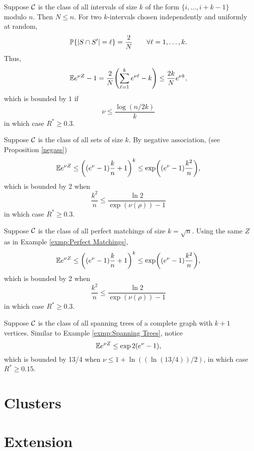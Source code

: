 \documentclass[10pt, oneside]{article}
\begin{document}
\begin{exmp}
  Suppose ${\mathcal C}$ is the class of all intervals of size $k$ of the form $\{i,\ldots, i + k -1\}$ modulo $n$. Then $N \le n$. For two $k$-intervals chosen independently and uniformly at random,
  \[
  \mathbb{P}\{|S \cap S'| = \ell\} = \frac2N\qquad\forall\ell= 1,\ldots, k.
  \]
  Thus,
\[
\mathbb{E} e^{\nu Z}-1 = \frac2N \Biggl(\sum_{\ell=1}^k e^{\nu\ell}
-k\Biggr) \le\frac{2k}N e^{\nu k},
\]
which is bounded by $1$ if $$\nu\le\frac{\log(n/2k)}{k}$$
in which case $R^* \ge0.3$.
\end{exmp}

\begin{exmp}
  Suppose ${\mathcal C}$ is the class of all sets of size $k$. By negative association, (see Proposition \ref{negass})
  \[
  \mathbb{E} e^{\nu Z} \le\biggl((e^\nu-1) \frac{k}{n}+1\biggr)^k
  \le\exp\biggl((e^\nu-1) \frac{k^2}{n}\biggr),
  \]
  which is bounded by 2 when 
  $$\frac{k^2}{n} \le\frac{\ln2}{\exp(\nu(\rho)) -1}$$
  in which case $R^* \ge0.3$.
\end{exmp}

\begin{exmp}
  Suppose ${\mathcal C}$ is the class of all perfect matchings of size $k = \sqrt{n}$. Using the same $Z$ as in Example \ref{exmp:Perfect Matchings},
  \[
  \mathbb{E} e^{\nu Z} \le\biggl((e^\nu-1) \frac{k}{n}+1\biggr)^k
  \le\exp\biggl((e^\nu-1) \frac{k^2}{n}\biggr),
  \]
  which is bounded by 2 when 
  $$\frac{k^2}{n} \le\frac{\ln2}{\exp(\nu(\rho)) -1}$$
  in which case $R^* \ge0.3$.
\end{exmp}

\begin{exmp}
  Suppose ${\mathcal C}$ is the class of all spanning trees of a complete graph with $k+1$ vertices. Similar to Example \ref{exmp:Spanning Trees}, notice
  \[
  \mathbb{E} e^{\nu Z} \le \exp{2(e^\nu-1)},
  \]
  which is bounded by 13/4 when $\nu\le1+\ln((\ln(13/4))/2)$, in which case $R^* \ge0.15$.
\end{exmp}
\section{Clusters}
\label{subsec:Clusters}
\section{Extension}



\end{document}
